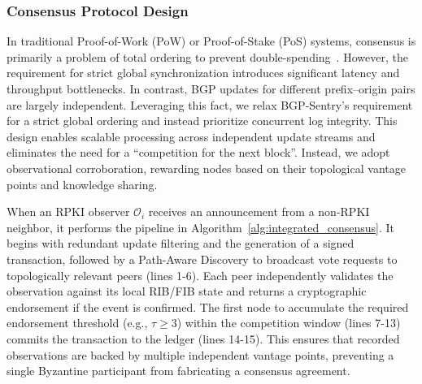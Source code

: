 \documentclass[conference]{IEEEtran}
\newcommand{\rj}[1]{{\color{blue}#1}}
\newcommand{\md}[1]{{\color{purple}#1}}
\begin{document}


\subsubsection{Consensus Protocol Design}
\md{In traditional Proof-of-Work (PoW) or Proof-of-Stake (PoS) systems, consensus is primarily a problem of total ordering to prevent double-spending~\cite{nakamoto2008bitcoin}. However, the requirement for strict global synchronization introduces significant latency and throughput bottlenecks.
In contrast, BGP updates for different prefix–origin pairs are largely independent. Leveraging this fact, we relax BGP-Sentry's requirement for a strict global ordering and instead prioritize concurrent log integrity. This design enables scalable processing across independent update streams and eliminates the need for a ``competition for the next block''. Instead, we adopt observational corroboration, rewarding nodes based on their topological vantage points and knowledge sharing.}

\md{When an RPKI observer $\mathcal{O}_i$ receives an announcement from a non-RPKI neighbor, it performs the pipeline in Algorithm~\ref{alg:integrated_consensus}. It begins with redundant update filtering and the generation of a signed transaction, followed by a Path-Aware Discovery to broadcast vote requests to topologically relevant peers (lines 1-6). Each peer independently validates the observation against its local RIB/FIB state and returns a cryptographic endorsement if the event is confirmed. The first node to accumulate the required endorsement threshold (e.g., $\tau \geq 3$) within the competition window (lines 7-13) commits the transaction to the ledger (lines 14-15). This ensures that recorded observations are backed by multiple independent vantage points, preventing a single Byzantine participant from fabricating a consensus agreement.}
\end{document}
